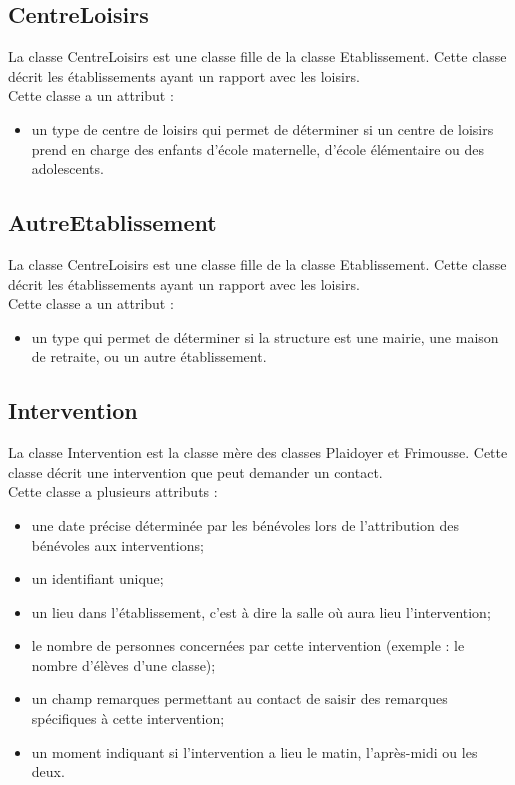 \documentclass[asi, sansVersion]{picInsa}
\begin{document}
\subsection*{CentreLoisirs}
La classe CentreLoisirs est une classe fille de la classe Etablissement. Cette classe décrit les établissements ayant un rapport avec les loisirs. \\
Cette classe a un attribut : 
\begin{itemize}
\item un type de centre de loisirs qui permet de déterminer si un centre de loisirs prend en charge des enfants d'école maternelle, d'école élémentaire ou des adolescents.
\end{itemize}  

\subsection*{AutreEtablissement}
La classe CentreLoisirs est une classe fille de la classe Etablissement. Cette classe décrit les établissements ayant un rapport avec les loisirs. \\
Cette classe a un attribut : 
\begin{itemize}
\item un type qui permet de déterminer si la structure est une mairie, une maison de retraite, ou un autre établissement.
\end{itemize}  

\subsection*{Intervention}
La classe Intervention est la classe mère des classes Plaidoyer et Frimousse. Cette classe décrit une intervention que peut demander un contact. \\
Cette classe a plusieurs attributs :
\begin{itemize}
\item une date précise déterminée par les bénévoles lors de l'attribution des bénévoles aux interventions;
\item un identifiant unique;
\item un lieu dans l'établissement, c'est à dire la salle où aura lieu l'intervention;
\item le nombre de personnes concernées par cette intervention (exemple : le nombre d'élèves d'une classe);
\item un champ remarques permettant au contact de saisir des remarques spécifiques à cette intervention;
\item un moment indiquant si l'intervention a lieu le matin, l'après-midi ou les deux.
\end{itemize}
\end{document}
